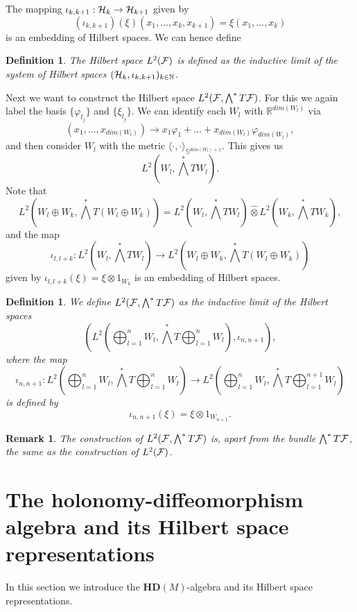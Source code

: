 \documentclass[letterpaper,11pt]{article}
\def\ch{{\cal H}}
\newtheorem{definition}[thm]{Definition}
\newtheorem{remark}{Remark}
\newcommand{\cF}{{\cal F}}
\newcommand{\R}{\mathbb{ R}}
\begin{document}
The mapping $ \iota_{k,k+1}:\ch_k\to \ch_{k+1}$ given by
$$ (\iota_{k,k+1})(\xi)(x_1,\ldots , x_k,x_{k+1})=\xi(x_1,\ldots , x_k)$$
is an embedding of Hilbert spaces. We can hence define
\begin{definition}
The Hilbert space $L^2(\cF)$ is defined as the inductive limit of the system of Hilbert spaces $(\ch_k,\iota_{k,k+1})_{k\in \mathbb{N}}$. 
\end{definition}

Next we want to construct the Hilbert space $L^2(\cF,\bigwedge^* T\cF )$. For this we again label the basis $\{\varphi_{l_j} \}$ and $\{ \xi_{l_j} \}$. We can identify each $W_l$ with $\R^{dim(W_l)}$ via
$$(x_1,\ldots ,x_{dim(W_l)})\to x_1\varphi_1+\ldots +x_{dim(W_l)} \varphi_{dim(W_l)},$$
and then consider $W_l$  with the metric $\langle \cdot ,\cdot \rangle_{\mathbb{S}^{dim(W_l)+1}}$. This gives us 
$$L^2(W_l,\bigwedge^* TW_l ).$$ Note that 
$$L^2(W_l\oplus W_k,\bigwedge^* T (W_l\oplus W_k) ) =L^2(W_l,\bigwedge^* TW_l ) \hat{\otimes} L^2(W_k,\bigwedge^* TW_k ),$$
and the map 
$$\iota_{l,l+k}:L^2(W_l,\bigwedge^* TW_l ) \to L^2(W_l\oplus W_k,\bigwedge^* T (W_l\oplus W_k) ) $$
given by $\iota_{l,l+k}(\xi)=\xi \otimes 1_{W_k}$ is an embedding of Hilbert spaces.

\begin{definition}
We define $L^2(\cF,\bigwedge^* T\cF )$ as the inductive limit of the Hilbert spaces 
$$(L^2 (\bigoplus_{l=1}^nW_l, \bigwedge^* T\bigoplus_{l=1}^n W_l), \iota_{n,n+1}) ,$$
where the map 
$$ \iota_{n,n+1}:L^2 (\bigoplus_{l=1}^nW_l, \bigwedge^* T\bigoplus_{l=1}^n W_l)\to L^2 (\bigoplus_{l=1}^{n}W_l, \bigwedge^* T\bigoplus_{l=1}^{n+1} W_l)  $$
is defined by 
 $$\iota_{n,n+1}(\xi)=\xi \otimes 1_{W_{n+1}}.$$
\end{definition}

\begin{remark} 
The construction of $L^2(\cF,\bigwedge^* T\cF )$ is, apart from the bundle $\bigwedge^* T\cF$, the same as the construction of  $L^2(\cF)$.
\end{remark}



\section{The holonomy-diffeomorphism algebra and its Hilbert space representations }

In this section we introduce the $\mathbf{HD}(M)$-algebra and its Hilbert space representations.\\
\end{document}
